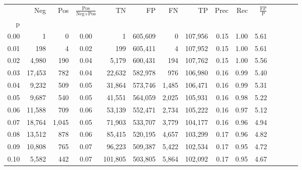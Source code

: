 \begin{tabular}{rrrcrrrrrrrrrrr}
\toprule
{} &     Neg &    Pos & $\frac{\text{Pos}}{\text{Neg}+\text{Pos}}$ &       TN &       FP &       FN &       TP &  Prec &   Rec & $\frac{\text{FP}}{\text{P}}$ \\
p    &         &        &                                            &          &          &          &          &       &       &                              \\
\midrule
0.00 &       1 &      0 &                                       0.00 &        1 &  605,609 &        0 &  107,956 &  0.15 &  1.00 &                         5.61 \\
0.01 &     198 &      4 &                                       0.02 &      199 &  605,411 &        4 &  107,952 &  0.15 &  1.00 &                         5.61 \\
0.02 &   4,980 &    190 &                                       0.04 &    5,179 &  600,431 &      194 &  107,762 &  0.15 &  1.00 &                         5.56 \\
0.03 &  17,453 &    782 &                                       0.04 &   22,632 &  582,978 &      976 &  106,980 &  0.16 &  0.99 &                         5.40 \\
0.04 &   9,232 &    509 &                                       0.05 &   31,864 &  573,746 &    1,485 &  106,471 &  0.16 &  0.99 &                         5.31 \\
0.05 &   9,687 &    540 &                                       0.05 &   41,551 &  564,059 &    2,025 &  105,931 &  0.16 &  0.98 &                         5.22 \\
0.06 &  11,588 &    709 &                                       0.06 &   53,139 &  552,471 &    2,734 &  105,222 &  0.16 &  0.97 &                         5.12 \\
0.07 &  18,764 &  1,045 &                                       0.05 &   71,903 &  533,707 &    3,779 &  104,177 &  0.16 &  0.96 &                         4.94 \\
0.08 &  13,512 &    878 &                                       0.06 &   85,415 &  520,195 &    4,657 &  103,299 &  0.17 &  0.96 &                         4.82 \\
0.09 &  10,808 &    765 &                                       0.07 &   96,223 &  509,387 &    5,422 &  102,534 &  0.17 &  0.95 &                         4.72 \\
0.10 &   5,582 &    442 &                                       0.07 &  101,805 &  503,805 &    5,864 &  102,092 &  0.17 &  0.95 &                         4.67 \\

\end{tabular}
